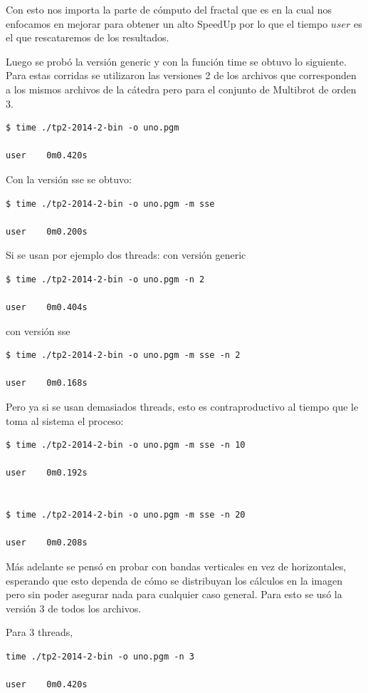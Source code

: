 \documentclass[a4paper,10pt]{article}
\begin{document}
Con esto nos importa la parte de cómputo del fractal que es en la cual nos enfocamos en mejorar para obtener un alto SpeedUp por lo que el tiempo $user$ es el que rescataremos de los resultados.

Luego se probó la versión generic y con la función time se obtuvo lo siguiente.
Para estas corridas se utilizaron las versiones 2 de los archivos que corresponden a los mismos archivos de la cátedra pero para el conjunto de Multibrot de orden 3.

\begin{verbatim}
$ time ./tp2-2014-2-bin -o uno.pgm

user	0m0.420s
\end{verbatim}

Con la versión sse se obtuvo:
\begin{verbatim}
$ time ./tp2-2014-2-bin -o uno.pgm -m sse

user	0m0.200s
\end{verbatim}


Si se usan por ejemplo dos threads:
con versión generic
\begin{verbatim}
$ time ./tp2-2014-2-bin -o uno.pgm -n 2

user	0m0.404s
\end{verbatim}

con versión sse
\begin{verbatim}
$ time ./tp2-2014-2-bin -o uno.pgm -m sse -n 2

user	0m0.168s
\end{verbatim}

Pero ya si se usan demasiados threads, esto es contraproductivo al tiempo que le toma al sistema el proceso:
\begin{verbatim}
$ time ./tp2-2014-2-bin -o uno.pgm -m sse -n 10

user	0m0.192s


$ time ./tp2-2014-2-bin -o uno.pgm -m sse -n 20

user	0m0.208s
\end{verbatim}




Más adelante se pensó en probar con bandas verticales en vez de horizontales, esperando que esto dependa de cómo se distribuyan los cálculos en la imagen pero sin poder asegurar nada para cualquier caso general.
Para esto se usó la versión 3 de todos los archivos.

Para 3 threads,
\begin{verbatim}
time ./tp2-2014-2-bin -o uno.pgm -n 3

user	0m0.420s
\end{verbatim}
\end{document}
